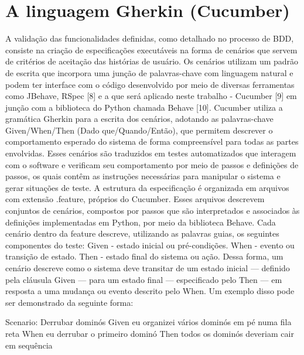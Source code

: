 



\section{A linguagem Gherkin (Cucumber)}
A validação das funcionalidades definidas, como detalhado no processo de BDD, consiste na criação de especificações executáveis na forma de cenários que servem de critérios de aceitação das histórias de usuário. Os cenários utilizam um padrão de escrita que incorpora uma junção de palavras-chave com linguagem natural e podem ter interface com o código desenvolvido por meio de diversas ferramentas como JBehave, RSpec [8] e a que será aplicado neste trabalho - Cucumber [9]  em junção com a biblioteca do Python chamada Behave [10].
Cucumber utiliza a gramática Gherkin para a escrita dos cenários, adotando as palavras-chave Given/When/Then (Dado que/Quando/Então), que permitem descrever o comportamento esperado do sistema de forma compreensível para todas as partes envolvidas. Esses cenários são traduzidos em testes automatizados que interagem com o software e verificam seu comportamento por meio de passos e definições de passos, os quais contêm as instruções necessárias para manipular o sistema e gerar situações de teste.
A estrutura da especificação é organizada em arquivos com extensão .feature, próprios do Cucumber. Esses arquivos descrevem conjuntos de cenários, compostos por passos que são interpretados e associados às definições implementadas em Python, por meio da biblioteca Behave. Cada cenário dentro da feature descreve, utilizando as palavras guias, os seguintes componentes do teste:
Given - estado inicial ou pré-condições.
When - evento ou transição de estado.
Then - estado final do sistema ou ação.
Dessa forma, um cenário descreve como o sistema deve transitar de um estado inicial — definido pela cláusula Given — para um estado final — especificado pelo Then — em resposta a uma mudança ou evento descrito pelo When. Um exemplo disso pode ser demonstrado da seguinte forma:

Scenario: Derrubar dominós
Given eu organizei vários dominós em pé numa fila reta
When eu derrubar o primeiro dominó
Then todos os dominós deveriam cair em sequência 

